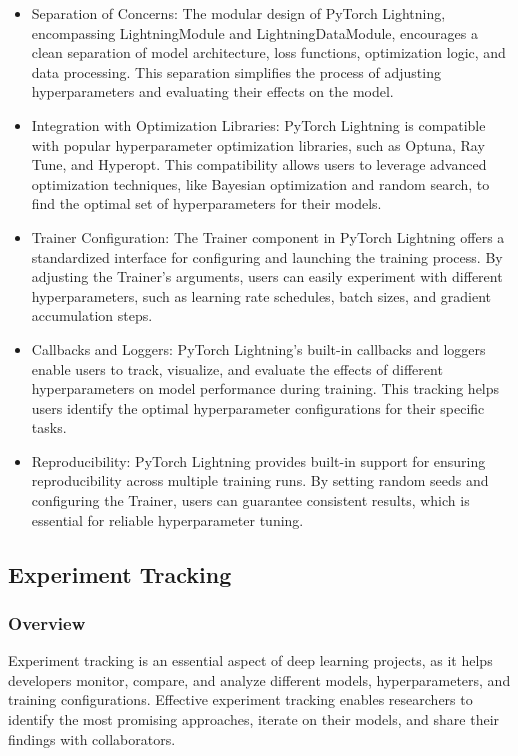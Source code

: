 \documentclass[12pt]{article}
\begin{document}
\begin{itemize}
    \item Separation of Concerns: The modular design of PyTorch Lightning, encompassing LightningModule and LightningDataModule, encourages a clean separation of model architecture, loss functions, optimization logic, and data processing. This separation simplifies the process of adjusting hyperparameters and evaluating their effects on the model.
    \item Integration with Optimization Libraries: PyTorch Lightning is compatible with popular hyperparameter optimization libraries, such as Optuna, Ray Tune, and Hyperopt. This compatibility allows users to leverage advanced optimization techniques, like Bayesian optimization and random search, to find the optimal set of hyperparameters for their models.
    \item Trainer Configuration: The Trainer component in PyTorch Lightning offers a standardized interface for configuring and launching the training process. By adjusting the Trainer's arguments, users can easily experiment with different hyperparameters, such as learning rate schedules, batch sizes, and gradient accumulation steps.
    \item Callbacks and Loggers: PyTorch Lightning's built-in callbacks and loggers enable users to track, visualize, and evaluate the effects of different hyperparameters on model performance during training. This tracking helps users identify the optimal hyperparameter configurations for their specific tasks.
    \item Reproducibility: PyTorch Lightning provides built-in support for ensuring reproducibility across multiple training runs. By setting random seeds and configuring the Trainer, users can guarantee consistent results, which is essential for reliable hyperparameter tuning.
\end{itemize}

\subsection{Experiment Tracking}

\subsubsection{Overview}

Experiment tracking is an essential aspect of deep learning projects, as it helps developers monitor, compare, and analyze different models, hyperparameters, and training configurations. Effective experiment tracking enables researchers to identify the most promising approaches, iterate on their models, and share their findings with collaborators.
\end{document}
